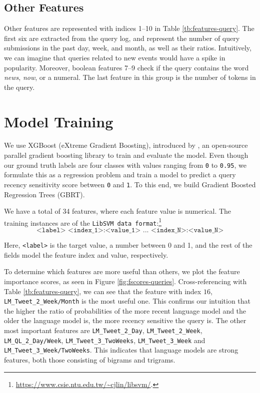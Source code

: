 \subsection{Other Features}
Other features are represented with indices 1--10 in Table \ref{tb:features-query}. The first six are extracted from the query log, and represent the number of query submissions in the past day, week, and month, as well as their ratios. Intuitively, we can imagine that queries related to new events would have a spike in popularity. Moreover, boolean features 7--9 check if the query contains the word \textit{news}, \textit{now}, or a numeral. The last feature in this group is the number of tokens in the query.

\section{Model Training}
We use XGBoost (eXtreme Gradient Boosting), introduced by \citet{chen2016xgboost}, an open-source parallel gradient boosting library to train and evaluate the model. Even though our ground truth labels are four classes with values ranging from \texttt{0} to \texttt{0.95}, we formulate this as a regression problem and train a model to predict a query recency sensitivity score between \texttt{0} and \texttt{1}. To this end, we build Gradient Boosted Regression Trees (GBRT).

We have a total of 34 features, where each feature value is numerical. The training instances are of the \texttt{LibSVM data format}:\footnote{\url{https://www.csie.ntu.edu.tw/~cjlin/libsvm/}.}
\[ \texttt{<label> <index\_1>:<value\_1> ... <index\_N>:<value\_N>} \]

Here, \texttt{<label>} is the target value, a number between 0 and 1, and the rest of the fields model the feature index and value, respectively.

To determine which features are more useful than others, we plot the feature importance scores, as seen in Figure \ref{fig:fscores-queries}. Cross-referencing with Table \ref{tb:features-query}, we can see that the feature with index $16$, \texttt{LM\_Tweet\_2\_Week/Month} is the most useful one. This confirms our intuition that the higher the ratio of probabilities of the more recent language model and the older the language model is, the more recency sensitive the query is. The other most important features are \texttt{LM\_Tweet\_2\_Day}, \texttt{LM\_Tweet\_2\_Week}, \texttt{LM\_QL\_2\_Day/Week}, \texttt{LM\_Tweet\_3\_TwoWeeks}, \texttt{LM\_Tweet\_3\_Week} and \texttt{LM\_Tweet\_3\_Week/TwoWeeks}. This indicates that language models are strong features, both those consisting of bigrams and trigrams.

